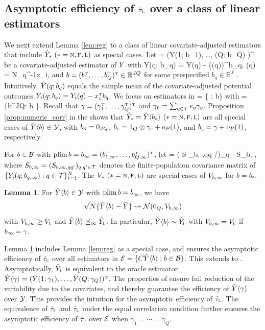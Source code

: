 \documentclass[11pt]{article}
\theoremstyle{definition}
\newtheorem{lemma}{Lemma}
\begin{document}
\subsection{Asymptotic efficiency of $\hat\tau_\textup{L}$ over a class of linear  estimators}
We next extend Lemma \ref{lem:reg}   to a  class of linear covariate-adjusted estimators that include $\hat Y_* \ (* =\textsc{n}, \textsc{f}, \textsc{l})$ as special cases. 
Let 
\begina
 \hyba= (\hat Y(1; b_1), \ldots, \hy(Q; b_Q) )^\T
\enda be a covariate-adjusted estimator of $\bar Y$ with 
\begina 
\hat Y(q; b_q) = \hat Y(q) - \{\hx(q)\}^\T b_q, \qquad \hx(q) = N_q^{-1}\sumiq x_i, 
\enda and $b = (b_1^{ \mathrm{\scriptscriptstyle T} }, \ldots, b_Q^{ \mathrm{\scriptscriptstyle T} })^{ \mathrm{\scriptscriptstyle T} }\in\mathbb R^{JQ}$ for some prespecified $b_q \in \mathbb R^J$ \citep{Lin13, LD20}. 
Intuitively, $
\hat Y(q; b_q)$ equals the sample mean of the covariate-adjusted potential outcomes $Y_i(q; b_q) = Y_i(q) - x_i ^{ \mathrm{\scriptscriptstyle T} } b_q$. 
We focus on estimators in 
\beginy\label{eq:my}
\my = \{ \hyba: b\in\mb \}
\endy with
\begina
 \mb = \{b\in\bbr^{JQ}: \plim b \}.
\enda
Recall that $ \gamma = (\gamma_1^{ \mathrm{\scriptscriptstyle T} }, \ldots, \gamma_Q^{ \mathrm{\scriptscriptstyle T} })^{ \mathrm{\scriptscriptstyle T} }$ and $ \gamma_{\textsc{f}} = \sum_{q \in\mathcal{T}} e_q \gamma_q$.
Proposition \ref{prop:numeric_corr} in the {\sm} shows that $ \hat Y_* = \hat Y\langle b_*\rangle \ (* =\textsc{n}, \textsc{f}, \textsc{l})$ are all special cases of $\hat Y\langle b \rangle\in\mathcal{Y}$, with $b_{\textsc{n}} = 0_{JQ}$, $b_{\textsc{f}}  = 1_Q\otimes \gamma_{\textsc{f}} + o_P(1)$, and $b_{\textsc{l}} = \gamma + o_P(1)$, respectively. 

For $b   \in \mathcal{B}$ with $\textup{plim\,} b = b_\infty = (b_{1,\infty}^{ \mathrm{\scriptscriptstyle T} }, \ldots, b^{ \mathrm{\scriptscriptstyle T} }_{Q, \infty})^{ \mathrm{\scriptscriptstyle T} }$, %
let 
\beginy\label{eq:vbi}
\vbi =  \diag( S _{b, \infty,qq} /\pq )_{q\in\mt} -  S_{b, \infty},
\endy 
where $S_{b,\infty} =  (S _{b, \infty,qq'})_{q,q'\in\mathcal{T}}$ denotes the finite-population covariance matrix of $\{Y_i(q; b_{q,\infty}): q\in\mathcal{T}\}_{i=1}^N$.
The $V_* \ (\nfl)$ are special cases of $V_{b,\infty}$ for $b = b_*$. 



\begin{lemma}\label{lem:yb}
{\precre}
For $\hat Y\langle b \rangle\in \mathcal{Y}$ with $\textup{plim\,} b = b_\infty$, we have 
$$
\sqrt N \{\hat Y\langle b \rangle-\bar Y\} \rightsquigarrow\mathcal{N}(0_Q, V_{b,\infty})$$ with    
$V_{b,\infty} \geq V_{\textsc{l}}$ and $\hat Y\langle b \rangle\preceq_\infty \hat Y_{\textsc{l}}$. 
In particular, $\hat Y\langle b \rangle\overset{\cdot}{\sim} \hat Y_{\textsc{l}}$ with $V_{b,\infty} = V_{\textsc{l}}$  if $b_\infty = \gamma$. 
\end{lemma}

Lemma \ref{lem:yb} includes Lemma \ref{lem:reg} as a special case, and ensures the asymptotic efficiency of $\hat\tau_{\textsc{l}}$ over all estimators in
$
\mathcal{E} = \{C\hat Y\langle b \rangle:  b \in \mathcal{B}\} 
$. 
This extends \citet[][Example 9]{LD20} to \mes.
Asymptotically, $\hat Y_{\textsc{l}}$ is equivalent to the oracle estimator $\hat Y\langle\gamma\rangle = (\hat Y(1; \gamma_1), \ldots, \hat Y(Q; \gamma_Q))^{ \mathrm{\scriptscriptstyle T} }$.
The properties of \olss ensure full reduction of the variability due to the covariates, and thereby guarantee the efficiency of $\hat Y\langle\gamma\rangle $ over $ \mathcal{Y}$. This provides the intuition for the asymptotic efficiency of $\hat\tau_{\textsc{l}}$. The equivalence of $\hat\tau_{\textsc{f}}$ and $\hat\tau_{\textsc{l}}$ under the equal correlation condition further ensures the asymptotic efficiency of $\hat\tau_{\textsc{f}}$ over $\mathcal{E}$ when $\gamma_1 = \cdots =\gamma_Q$.
 
\end{document}
